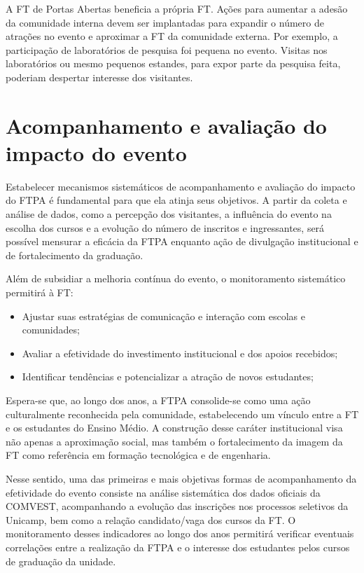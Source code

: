 \documentclass[
  letterpaper,
  DIV=11,
  numbers=noendperiod]{scrreprt}
\begin{document}
A FT de Portas Abertas beneficia a própria FT. Ações para aumentar a
adesão da comunidade interna devem ser implantadas para expandir o
número de atrações no evento e aproximar a FT da comunidade externa. Por
exemplo, a participação de laboratórios de pesquisa foi pequena no
evento. Visitas nos laboratórios ou mesmo pequenos estandes, para expor
parte da pesquisa feita, poderiam despertar interesse dos visitantes.

\section{Acompanhamento e avaliação do impacto do
evento}\label{acompanhamento-e-avaliauxe7uxe3o-do-impacto-do-evento}

Estabelecer mecanismos sistemáticos de acompanhamento e avaliação do
impacto do FTPA é fundamental para que ela atinja seus objetivos. A
partir da coleta e análise de dados, como a percepção dos visitantes, a
influência do evento na escolha dos cursos e a evolução do número de
inscritos e ingressantes, será possível mensurar a eficácia da FTPA
enquanto ação de divulgação institucional e de fortalecimento da
graduação.

Além de subsidiar a melhoria contínua do evento, o monitoramento
sistemático permitirá à FT:

\begin{itemize}
\item
  Ajustar suas estratégias de comunicação e interação com escolas e
  comunidades;
\item
  Avaliar a efetividade do investimento institucional e dos apoios
  recebidos;
\item
  Identificar tendências e potencializar a atração de novos estudantes;
\end{itemize}

Espera-se que, ao longo dos anos, a FTPA consolide-se como uma ação
culturalmente reconhecida pela comunidade, estabelecendo um vínculo
entre a FT e os estudantes do Ensino Médio. A construção desse caráter
institucional visa não apenas a aproximação social, mas também o
fortalecimento da imagem da FT como referência em formação tecnológica e
de engenharia.

Nesse sentido, uma das primeiras e mais objetivas formas de
acompanhamento da efetividade do evento consiste na análise sistemática
dos dados oficiais da COMVEST, acompanhando a evolução das inscrições
nos processos seletivos da Unicamp, bem como a relação candidato/vaga
dos cursos da FT. O monitoramento desses indicadores ao longo dos anos
permitirá verificar eventuais correlações entre a realização da FTPA e o
interesse dos estudantes pelos cursos de graduação da unidade.
\end{document}
